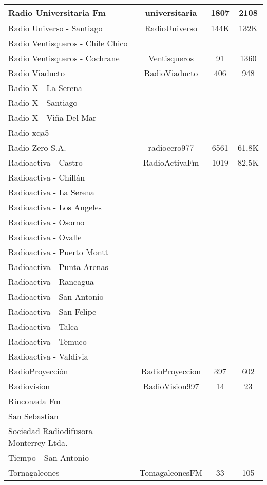 \begin{center}
\begin{longtable}{| l | c | c | c |}
Radio Universitaria Fm	&	universitaria	&	1807	&	2108	\\ \hline
Radio Universo - Santiago	&	RadioUniverso	&	144K	&	132K	\\ \hline
Radio Ventisqueros - Chile Chico	&		&		&		\\ \hline
Radio Ventisqueros - Cochrane	&	Ventisqueros	&	91	&	1360	\\ \hline
Radio Viaducto	&	RadioViaducto	&	406	&	948	\\ \hline
Radio X - La Serena	&		&		&		\\ \hline
Radio X - Santiago	&		&		&		\\ \hline
Radio X - Viña Del Mar	&		&		&		\\ \hline
Radio xqa5	&		&		&		\\ \hline
Radio Zero S.A.	&	radiocero977	&	6561	&	61,8K	\\ \hline
Radioactiva - Castro	&	RadioActivaFm	&	1019	&	82,5K	\\ \hline
Radioactiva - Chillán	&		&		&		\\ \hline
Radioactiva - La Serena	&		&		&		\\ \hline
Radioactiva - Los Angeles	&		&		&		\\ \hline
Radioactiva - Osorno	&		&		&		\\ \hline
Radioactiva - Ovalle	&		&		&		\\ \hline
Radioactiva - Puerto Montt	&		&		&		\\ \hline
Radioactiva - Punta Arenas	&		&		&		\\ \hline
Radioactiva - Rancagua	&		&		&		\\ \hline
Radioactiva - San Antonio	&		&		&		\\ \hline
Radioactiva - San Felipe	&		&		&		\\ \hline
Radioactiva - Talca	&		&		&		\\ \hline
Radioactiva - Temuco	&		&		&		\\ \hline
Radioactiva - Valdivia	&		&		&		\\ \hline
RadioProyección	&	RadioProyeccion	&	397	&	602	\\ \hline
Radiovision	&	RadioVision997	&	14	&	23	\\ \hline
Rinconada Fm	&		&		&		\\ \hline
San Sebastian	&		&		&		\\ \hline
Sociedad Radiodifusora Monterrey Ltda.	&		&		&		\\ \hline
Tiempo - San Antonio	&		&		&		\\ \hline
Tornagaleones	&	TomagaleonesFM	&	33	&	105	\\ \hline

\end{longtable}
\end{center}

